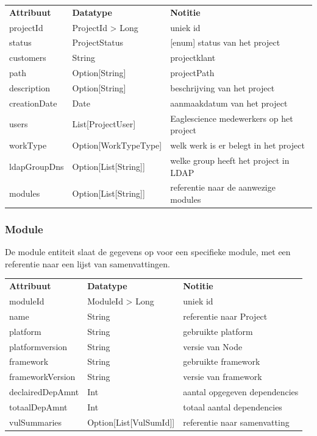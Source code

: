 \begin{tabular}{lll}
    \textbf{Attribuut} & \textbf{Datatype} & \textbf{Notitie}\\
    projectId & ProjectId > Long & uniek id\\
    status & ProjectStatus & [enum] status van het project\\
    customers & String & projectklant\\
    path & Option[String] & projectPath\\
    description & Option[String] & beschrijving van het project\\
    creationDate & Date & aanmaakdatum van het project \\
    users & List[ProjectUser] & Eaglescience medewerkers op het project \\
    workType & Option[WorkTypeType] & welk werk is er belegt in het project   \\
    ldapGroupDns & Option[List[String]] & welke group heeft het project in LDAP  \\
    modules & Option[List[String]] & referentie naar de aanwezige modules  \\
\end{tabular}

\subsubsection{Module}\label{subsubsec:portalModule}
De module entiteit slaat de gegevens op voor een specifieke module, met een referentie naar een lijst van samenvattingen.

\begin{tabular}{lll}
    \textbf{Attribuut} & \textbf{Datatype} & \textbf{Notitie}\\
    moduleId & ModuleId > Long & uniek id \\
    name & String & referentie naar Project\\
    platform & String & gebruikte platform \\
    platformversion & String & versie van Node  \\
    framework & String &  gebruikte framework  \\
    frameworkVersion & String & versie van framework  \\
    declairedDepAmnt & Int & aantal opgegeven dependencies\\
    totaalDepAmnt & Int & totaal aantal dependencies\\
    vulSummaries & Option[List[VulSumId]]& referentie naar samenvatting\\
\end{tabular}

